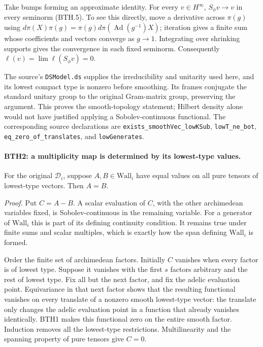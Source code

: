 Take bumps forming an approximate identity.  For every
\(v\in H^\infty\), \(S_\phi v\to v\) in every seminorm (BTH.5).
To see this directly, move a derivative across \(\pi(g)\) using
\(d\pi(X)\pi(g)=\pi(g)d\pi(\operatorname{Ad}(g^{-1})X)\);
iteration gives a finite sum whose coefficients and vectors
converge as \(g\to1\).  Integrating over shrinking supports gives
the convergence in each fixed seminorm.  Consequently
\(\ell(v)=\lim\ell(S_\phi v)=0\).

The source's \texttt{DSModel.ds} supplies the irreducibility
and unitarity used here, and its lowest compact type is nonzero
before smoothing.  Its frames conjugate the standard unitary
group to the original Gram-matrix group, preserving the argument.
This proves the smooth-topology statement; Hilbert density alone
would not have justified applying a Sobolev-continuous functional.
The corresponding source declarations are
\texttt{exists\_\allowbreak smooth\allowbreak Vec\_\allowbreak low\allowbreak KSub}, \texttt{low\allowbreak T\_\allowbreak ne\_\allowbreak bot},
\texttt{eq\_\allowbreak zero\_\allowbreak of\_\allowbreak translates}, and \texttt{low\allowbreak Generates}.

\paragraph{BTH2: a multiplicity map is determined by its lowest-type values.}
\label{claim:BTH2}
For the original \(\mathcal D_i\), suppose \(A,B\in\mathrm{Wall}_i\)
have equal values on all pure tensors of lowest-type vectors.
Then \(A=B\).

\emph{Proof.}
Put \(C=A-B\).  A scalar evaluation of \(C\), with the other
archimedean variables fixed, is Sobolev-continuous in the
remaining variable.  For a generator of \(\mathrm{Wall}_i\)
this is part of its defining continuity condition.  It remains
true under finite sums and scalar multiples, which is exactly
how the span defining \(\mathrm{Wall}_i\) is formed.

Order the finite set of archimedean factors.  Initially \(C\)
vanishes when every factor is of lowest type.  Suppose it
vanishes with the first \(s\) factors arbitrary and the rest
of lowest type.  Fix all but the next factor, and fix the
adelic evaluation point.  Equivariance in that next factor
shows that the resulting functional vanishes on every
translate of a nonzero smooth lowest-type vector: the translate
only changes the adelic evaluation point in a function that
already vanishes identically.  BTH1 makes this functional
zero on the entire smooth factor.  Induction removes all the
lowest-type restrictions.  Multilinearity and the spanning
property of pure tensors give \(C=0\).

